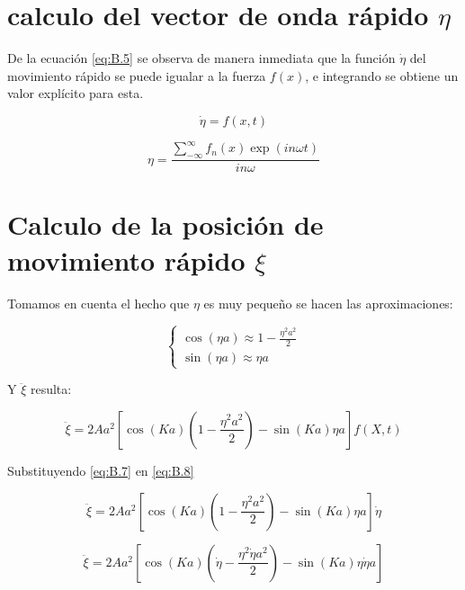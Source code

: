 \section{calculo del vector de onda rápido $\eta$}\label{apendice:B.2}

De la ecuación \ref{eq:B.5} se observa de manera inmediata que la función $\dot{\eta}$ del movimiento rápido se puede igualar a la fuerza $f(x)$, e integrando se obtiene un valor explícito para esta.
     
\begin{equation} \label{eq:B.5}
    \dot{\eta}=f(x,t) 
\end{equation}
    
\begin{equation}\label{eq:B.6}
    \eta=\frac{\sum_{-\infty}^{\infty} f_n(x)\exp(in\omega t)}{in\omega}
\end{equation}


\section{Calculo de la posición de movimiento rápido $\xi$}\label{apendice:B.3}

Tomamos en cuenta el hecho que $\eta$ es muy pequeño se hacen las aproximaciones:

    \begin{equation}\label{eq:B.7}
        \begin{cases}
            \cos(\eta a) \approx 1-\frac{\eta^2a^2}{2}\\
            \sin(\eta a) \approx \eta a 
        \end{cases}
    \end{equation}

Y $\ddot{\xi}$ resulta:

    \begin{equation}\label{eq:B.8}
        \ddot{\xi}=2Aa^2[\cos(Ka)(1-\frac{\eta^2a^2}{2})-\sin(Ka)\eta a ]f(X,t)
    \end{equation}

Substituyendo \ref{eq:B.7} en \ref{eq:B.8}

    \begin{equation}\label{eq:B.9}
        \ddot{\xi}=2Aa^2[\cos(Ka)(1-\frac{\eta^2a^2}{2})-\sin(Ka)\eta a ]\dot{\eta}
    \end{equation}

    \begin{equation}\label{eq:B.10}
        \ddot{\xi}=2Aa^2[\cos(Ka)(\dot{\eta}-\frac{\eta^2\dot{\eta}a^2}{2})-\sin(Ka)\eta\dot{\eta} a ]
    \end{equation}


